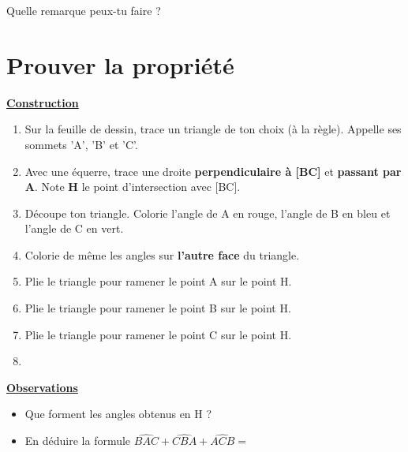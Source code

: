 \documentclass[a4paper,11pt]{article}
\begin{document}
\vspace{1em}
Quelle remarque peux-tu faire ? \dotfill

\section{Prouver la propriété}


\vspace{0.5em}
\uline{\large \textbf{Construction}}

\begin{enumerate}
	\item Sur la feuille de dessin, trace un triangle de ton choix (à la règle). Appelle ses sommets 'A', 'B' et 'C'.
	\item Avec une équerre, trace une droite \textbf{perpendiculaire à [BC]} et \textbf{passant par A}. Note \textbf{H} le point d'intersection avec [BC].
	\item Découpe ton triangle. Colorie l'angle de A en {\color{red}rouge}, l'angle de B en {\color{blue}bleu} et l'angle de C en {\color{green}vert}.
	\item Colorie de même les angles sur \textbf{l'autre face} du triangle.
	\item Plie le triangle pour ramener le point A sur le point H.
	\item Plie le triangle pour ramener le point B sur le point H.
	\item Plie le triangle pour ramener le point C sur le point H.
	\item {}
\end{enumerate}

\uline{\large \textbf{Observations}}

\begin{itemize}
	\item Que forment les angles obtenus en H ? \dotfill
	\item En déduire la formule $\widehat{BAC} + \widehat{CBA} + \widehat{ACB} = $ \dotfill
\end{itemize}
\end{document}
